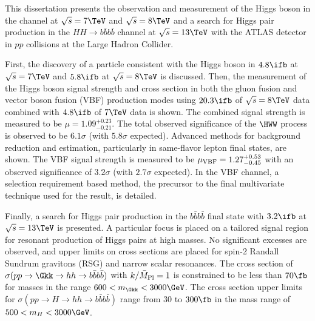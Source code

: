 \begin{RaggedRight}
\parindent 12pt
\begin{doublespace}

\indent This dissertation presents the observation and measurement of the Higgs boson in the \HWWfull channel at $\sqrt{s} = 7 \TeV$ and $\sqrt{s} = 8 \TeV$ and a search for Higgs pair production in the $HH\to b\bar{b}b\bar{b}$ channel at $\sqrt{s} = 13 \TeV$ with the ATLAS detector in $pp$ collisions at the Large Hadron Collider. 

First, the discovery of a particle consistent with the Higgs boson in $4.8\ifb$ at $\sqrt{s} = 7 \TeV$ and $5.8 \ifb$ at $\sqrt{s} = 8 \TeV$ is discussed. Then, the measurement of the Higgs boson signal strength and cross section in both the gluon fusion and vector boson fusion (VBF) production modes using $20.3\ifb$ of $\sqrt{s} = 8 \TeV$ data combined with $4.8\ifb$ of $7 \TeV$ data is shown. The combined signal strength is measured to be $\mu = 1.09^{+0.23}_{-0.21}$. The total observed significance of the $\HWW$ process is observed to be $6.1\sigma$ (with $5.8 \sigma$ expected). Advanced methods for background reduction and estimation, particularly in same-flavor lepton final states, are shown. The VBF signal strength is measured to be $\mu_{\rm VBF} = 1.27^{+0.53}_{-0.45}$ with an observed significance of $3.2\sigma$ (with $2.7 \sigma$ expected).  In the VBF channel, a selection requirement based method, the precursor to the final multivariate technique used for the result, is detailed. 

Finally, a search for Higgs pair production in the $b\bar{b}b\bar{b}$ final state with $3.2\ifb$ at $\sqrt{s} = 13\TeV$ is presented. A particular focus is placed on a tailored signal region for resonant production of Higgs pairs at high masses. No significant excesses are observed, and upper limits on cross sections are placed for spin-2 Randall Sundrum gravitons (RSG) and narrow scalar resonances. The cross section of $\sigma(pp \to \Gkk \to hh \to b\bar{b}b\bar{b})$ with $k/\bar{M}_{\rm Pl}=1$ is constrained to be less than $70 \fb$ for masses in the range $600 < m_{\Gkk} < 3000 \GeV$.  The cross section upper limits for $\sigma(pp \to H \to hh \to b\bar{b}b\bar{b})$ range from $30$ to $300 \fb$ in the mass range of $500 < m_{H} < 3000 \GeV$. 
\end{doublespace}
\end{RaggedRight}
